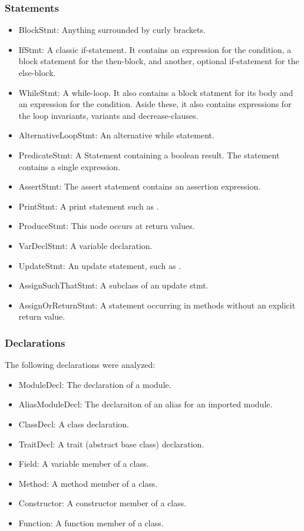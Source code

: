 \subsubsection{Statements}

\begin{itemize}
    \item BlockStmt: Anything surrounded by curly brackets.
    \item IfStmt: A classic if-statement. It contains an expression for the condition, a block statement for the then-block, and another, optional if-statement for the else-block.
    \item WhileStmt: A while-loop. It also contains a block statment for its body and an expression for the condition. Aside these, it also contains expressions for the loop invariants, variants and decrease-clauses.
    \item AlternativeLoopStmt: An alternative while statement.
    \item PredicateStmt: A Statement containing a boolean result. The statement contains a single expression.
    \item AssertStmt: The assert statement contains an assertion expression.
    \item PrintStmt: A print statement such as .
    \item ProduceStmt: This node occurs at return values.
    \item VarDeclStmt: A variable declaration.
    \item UpdateStmt: An update statement, such as .
    \item AssignSuchThatStmt: A subclass of an update stmt.
    \item AssignOrReturnStmt: A statement occurring in methods without an explicit return value.
\end{itemize}

\subsubsection{Declarations}
The following declarations were analyzed:
\begin{itemize}
    \item ModuleDecl: The declaration of a module.
    \item AliasModuleDecl: The declaraiton of an alias for an imported module.
    \item ClassDecl: A class declaration.
    \item TraitDecl: A trait (abstract base class) declaration.
    \item Field: A variable member of a class.
    \item Method: A method member of a class.
    \item Constructor: A constructor member of a class.
    \item Function: A function member of a class.
\end{itemize}

